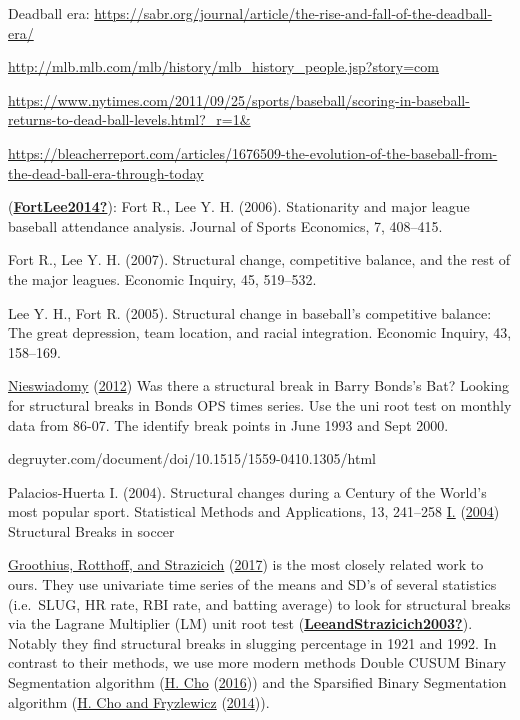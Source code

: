 \documentclass[
  12pt,
]{article}
\begin{document}
Deadball era:
\url{https://sabr.org/journal/article/the-rise-and-fall-of-the-deadball-era/}

\url{http://mlb.mlb.com/mlb/history/mlb_history_people.jsp?story=com}

\url{https://www.nytimes.com/2011/09/25/sports/baseball/scoring-in-baseball-returns-to-dead-ball-levels.html?_r=1\&}

\url{https://bleacherreport.com/articles/1676509-the-evolution-of-the-baseball-from-the-dead-ball-era-through-today}

(\protect\hyperlink{ref-FortLee2014}{\textbf{FortLee2014?}}): Fort R.,
Lee Y. H. (2006). Stationarity and major league baseball attendance
analysis. Journal of Sports Economics, 7, 408--415.

Fort R., Lee Y. H. (2007). Structural change, competitive balance, and
the rest of the major leagues. Economic Inquiry, 45, 519--532.

Lee Y. H., Fort R. (2005). Structural change in baseball's competitive
balance: The great depression, team location, and racial integration.
Economic Inquiry, 43, 158--169.

\protect\hyperlink{ref-Nieswiadomy2012}{Nieswiadomy}
(\protect\hyperlink{ref-Nieswiadomy2012}{2012}) Was there a structural
break in Barry Bonds's Bat? Looking for structural breaks in Bonds OPS
times series. Use the uni root test on monthly data from 86-07. The
identify break points in June 1993 and Sept 2000.

degruyter.com/document/doi/10.1515/1559-0410.1305/html

Palacios-Huerta I. (2004). Structural changes during a Century of the
World's most popular sport. Statistical Methods and Applications, 13,
241--258 \protect\hyperlink{ref-PalaciosHuerta2004}{I.}
(\protect\hyperlink{ref-PalaciosHuerta2004}{2004}) Structural Breaks in
soccer

\protect\hyperlink{ref-Groothius2017}{Groothius, Rotthoff, and
Strazicich} (\protect\hyperlink{ref-Groothius2017}{2017}) is the most
closely related work to ours. They use univariate time series of the
means and SD's of several statistics (i.e.~SLUG, HR rate, RBI rate, and
batting average) to look for structural breaks via the Lagrane
Multiplier (LM) unit root test
(\protect\hyperlink{ref-LeeandStrazicich2003}{\textbf{LeeandStrazicich2003?}}).
Notably they find structural breaks in slugging percentage in 1921 and
1992. In contrast to their methods, we use more modern methods Double
CUSUM Binary Segmentation algorithm (\protect\hyperlink{ref-Cho2016}{H.
Cho} (\protect\hyperlink{ref-Cho2016}{2016})) and the Sparsified Binary
Segmentation algorithm (\protect\hyperlink{ref-ChoFryzlewwicz2014}{H.
Cho and Fryzlewicz} (\protect\hyperlink{ref-ChoFryzlewwicz2014}{2014})).
\end{document}
